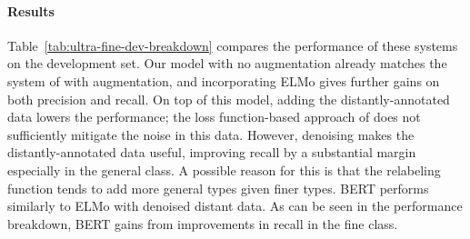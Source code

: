 \documentclass[11pt,a4paper]{article}
\begin{document}
\vspace{-4pt}
\paragraph{Results} Table~\ref{tab:ultra-fine-dev-breakdown} compares the performance of these systems on the development set. Our model with no augmentation already matches the system of \citet{Eunsol_Choi_18} with augmentation, and incorporating ELMo gives further gains on both precision and recall. On top of this model, adding the distantly-annotated data lowers the performance; the loss function-based approach of \cite{Eunsol_Choi_18} does not sufficiently mitigate the noise in this data. However, denoising makes the distantly-annotated data useful, improving recall by a substantial margin especially in the general class. A possible reason for this is that the relabeling function tends to add more general types given finer types. BERT performs similarly to ELMo with denoised distant data. As can be seen in the performance breakdown, BERT gains from improvements in recall in the fine class.   
\end{document}
